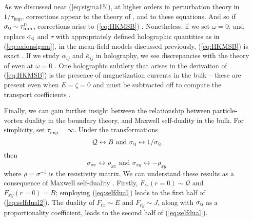 \documentclass[10pt, oneside]{book}
\begin{document}
\begin{doublespace}
As we discussed near (\ref{eq:sigma15}),  at higher orders in perturbation theory in $1/\tau_{\mathrm{imp}}$, corrections appear to the theory of \cite{hkms}, and to these equations.  And so if $\sigma_{\textsc{q}} \sim \tau^0_{\mathrm{imp}}$, corrections arise to (\ref{eq:HKMSB})  \cite{Blake:2015hxa}.   Nonetheless, if we set $\omega=0$,   and replace $\sigma_{\textsc{q}}$ and $\tau$ with appropriately defined holographic quantities as in (\ref{eq:axionsigma}),  in the mean-field models discussed previously,  (\ref{eq:HKMSB}) is exact \cite{Blake:2014yla}.   If we study $\alpha_{ij}$ and $\bar\kappa_{ij}$ in holography, we see discrepancies with the theory of \cite{hkms} even at $\omega=0$ \cite{Amoretti:2015gna, Blake:2015ina, Kim:2015wba}.    One holographic subtlety that arises in the derivation of (\ref{eq:HKMSB}) is the presence of magnetization currents in the bulk -- these are present even when $E=\zeta=0$ and must be subtracted off to compute the transport coefficients \cite{hkms}.
  



Finally, we can gain further insight between the relationship between particle-vortex duality in the boundary theory, and Maxwell self-duality in the bulk.   For simplicity,  set $\tau_{\mathrm{imp}}=\infty$.  Under the transformations \begin{equation}
\mathcal{Q} \leftrightarrow B \text{ and } \sigma_{\textsc{q}} \leftrightarrow 1/\sigma_{\textsc{q}} \label{eq:selfdual2}
\end{equation}then \begin{equation}
\sigma_{xx} \leftrightarrow \rho_{xx} \text{ and }  \sigma_{xy} \leftrightarrow -\rho_{xy}
\end{equation} 
where $\rho  = \sigma^{-1}$ is the resistivity matrix.   We can understand these results as a consequence of Maxwell self-duality \cite{Hartnoll:2007ip}.
Firstly, $F_{tr}(r=0) \sim \mathcal{Q}$ and $F_{xy}(r=0)=B$; employing  (\ref{eq:selfdual}) leads to the first half of (\ref{eq:selfdual2}).    The duality of $F_{tx}\sim E$ and $F_{ry}\sim J$,  along with $\sigma_{\textsc{q}}$ as a proportionality coefficient, leads to the second half of (\ref{eq:selfdual}).   



\end{doublespace}
\end{document}
